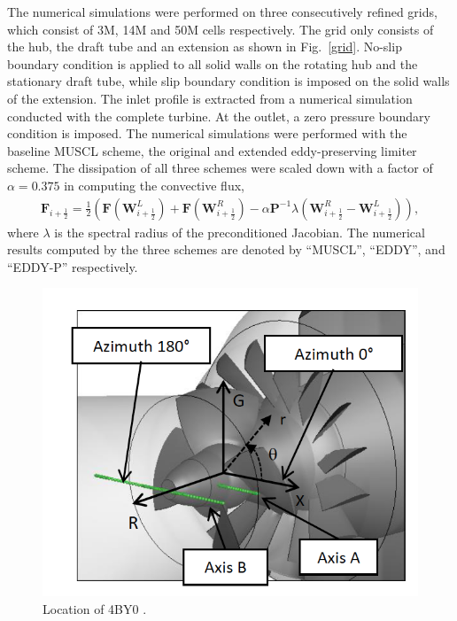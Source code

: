 The numerical simulations were performed on three consecutively refined grids, which consist of 3M, 14M and 50M cells respectively. The grid only consists of the hub, the draft tube and an extension as shown in Fig.~\ref{grid}. No-slip boundary condition is applied to all solid walls on the rotating hub and the stationary draft tube, while slip boundary condition is imposed on the solid walls of the extension. The inlet profile is extracted from a numerical simulation conducted with the complete turbine. At the outlet, a zero pressure boundary condition is imposed. The numerical simulations were performed with the baseline MUSCL scheme, the original and extended eddy-preserving limiter scheme. The dissipation of all three schemes were scaled down with a factor of $\alpha=0.375$ in computing the convective flux,
\begin{align} 
\mathbf{F}_{i+\frac{1}{2}} =\frac{1}{2}( \mathbf{F}(\mathbf{W}_{i+\frac{1}{2}}^{L})+\mathbf{F}(\mathbf{W}_{i+\frac{1}{2}}^{R})-\alpha \mathbf{P}^{-1} \lambda (\mathbf{W}_{i+\frac{1}{2}}^{R}-\mathbf{W}_{i+\frac{1}{2}}^{L})),
\label{rusanov}
\end{align}
where $\lambda$ is the spectral radius of the preconditioned Jacobian. The numerical results computed by the three schemes are denoted by ``MUSCL'', ``EDDY'', and ``EDDY-P'' respectively.
\begin{figure}[t]  
\centering      
     \includegraphics[clip=true, trim= 0.0cm 0.0cm 0.0cm 1.0cm,width=0.99\linewidth]{./figures/bulbt/Location4B}                  
     \caption{Location of 4BY0 \cite{vuillemard2014experimental}.}
     \label{plane4BY0}
\end{figure}

